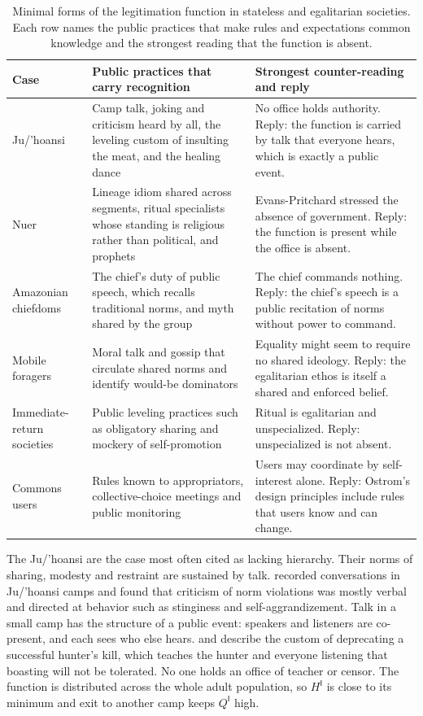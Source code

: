 \documentclass[11pt,letterpaper]{article}
\theoremstyle{definition}
\theoremstyle{remark}
\newcommand{\pI}{\mathsf{I}}
\begin{document}
\begin{table}[t]
\centering
\small
\caption{Minimal forms of the legitimation function in stateless and egalitarian societies. Each row names the public practices that make rules and expectations common knowledge and the strongest reading that the function is absent.}
\label{tab:minimal}
\begin{tabularx}{\textwidth}{@{}L{2.4cm}YY@{}}
\toprule
Case & Public practices that carry recognition & Strongest counter-reading and reply \\
\midrule
Ju/'hoansi & Camp talk, joking and criticism heard by all, the leveling custom of insulting the meat, and the healing dance \citep{lee1979,lee2013,marshall1976,wiessner2005} & No office holds authority. Reply: the function is carried by talk that everyone hears, which is exactly a public event. \\
Nuer & Lineage idiom shared across segments, ritual specialists whose standing is religious rather than political, and prophets \citep{evanspritchard1940} & Evans-Pritchard stressed the absence of government. Reply: the function is present while the office is absent. \\
Amazonian chiefdoms & The chief's duty of public speech, which recalls traditional norms, and myth shared by the group \citep{clastres1987} & The chief commands nothing. Reply: the chief's speech is a public recitation of norms without power to command. \\
Mobile foragers & Moral talk and gossip that circulate shared norms and identify would-be dominators \citep{boehm1999,boehm2012} & Equality might seem to require no shared ideology. Reply: the egalitarian ethos is itself a shared and enforced belief. \\
Immediate-return societies & Public leveling practices such as obligatory sharing and mockery of self-promotion \citep{woodburn1982} & Ritual is egalitarian and unspecialized. Reply: unspecialized is not absent. \\
Commons users & Rules known to appropriators, collective-choice meetings and public monitoring \citep{ostrom1990} & Users may coordinate by self-interest alone. Reply: Ostrom's design principles include rules that users know and can change. \\
\bottomrule
\end{tabularx}
\end{table}

The Ju/'hoansi are the case most often cited as lacking hierarchy. Their norms of sharing, modesty and restraint are sustained by talk. \citet{wiessner2005} recorded conversations in Ju/'hoansi camps and found that criticism of norm violations was mostly verbal and directed at behavior such as stinginess and self-aggrandizement. Talk in a small camp has the structure of a public event: speakers and listeners are co-present, and each sees who else hears. \citet{lee1979} and \citet{lee2013} describe the custom of deprecating a successful hunter's kill, which teaches the hunter and everyone listening that boasting will not be tolerated. No one holds an office of teacher or censor. The function is distributed across the whole adult population, so $H^{\pI}$ is close to its minimum and exit to another camp keeps $Q^{\pI}$ high.
\end{document}
